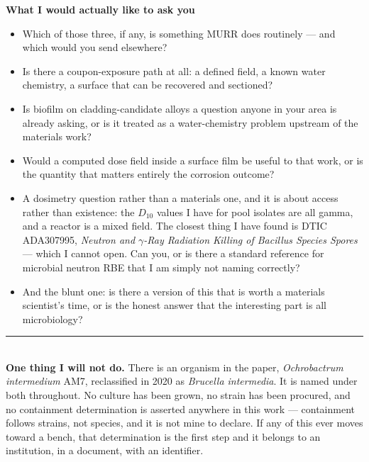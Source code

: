 \documentclass[landscape,12pt]{article}
\begin{document}
\begin{minipage}[t]{0.51\linewidth}
{\large\bfseries\color{model} What I would actually like to ask you}\\[3pt]
\begin{itemize}
  \item Which of those three, if any, is something MURR does routinely --- and which would you
        send elsewhere?
  \item Is there a coupon-exposure path at all: a defined field, a known water chemistry, a
        surface that can be recovered and sectioned?
  \item Is biofilm on cladding-candidate alloys a question anyone in your area is already
        asking, or is it treated as a water-chemistry problem upstream of the materials work?
  \item Would a computed dose field inside a surface film be useful to that work, or is the
        quantity that matters entirely the corrosion outcome?
  \item A dosimetry question rather than a materials one, and it is about access rather than
        existence: the $D_{10}$ values I have for pool isolates are all gamma, and a reactor is a
        mixed field. The closest thing I have found is DTIC ADA307995, \emph{Neutron and
        $\gamma$-Ray Radiation Killing of Bacillus Species Spores} --- which I cannot open. Can
        you, or is there a standard reference for microbial neutron RBE that I am simply not
        naming correctly?
  \item And the blunt one: is there a version of this that is worth a materials scientist's time,
        or is the honest answer that the interesting part is all microbiology?
\end{itemize}

\vspace{3mm}
\rule{\linewidth}{0.4pt}\\[3pt]
{\small\textbf{One thing I will not do.} There is an organism in the paper, \textit{Ochrobactrum
intermedium} AM7, reclassified in 2020 as \textit{Brucella intermedia}. It is named under both
throughout. No culture has been grown, no strain has been procured, and no containment
determination is asserted anywhere in this work --- containment follows strains, not species, and
it is not mine to declare. If any of this ever moves toward a bench, that determination is the
first step and it belongs to an institution, in a document, with an identifier.}
\end{minipage}
\end{document}
